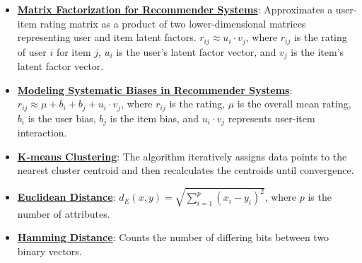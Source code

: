 \documentclass{article}%
\begin{document}
\begin{itemize}[leftmargin=*]
\item \href{https://purdue.brightspace.com/d2l/common/assets/pdfjs-d2l-dist/1.0.14-legacy/web/viewer.html?file=\%2Fcontent\%2Fenforced\%2F1095467-wl.202510.CS.24300.001\%2F11L2-svd-pca-recommender.pdf\%3Fou\%3D1095467\&lang=en-us\&container=d2l-fileviewer-rendered-pdf\&fullscreen=d2l-fileviewer-rendered-pdf-dialog\&height=667#page=36}{\textbf{Matrix Factorization for Recommender Systems}}: Approximates a user-item rating matrix as a product of two lower-dimensional matrices representing user and item latent factors. $r_{ij} \approx u_i \cdot v_j$, where $r_{ij}$ is the rating of user $i$ for item $j$, $u_i$ is the user's latent factor vector, and $v_j$ is the item's latent factor vector.%
\item \href{https://purdue.brightspace.com/d2l/common/assets/pdfjs-d2l-dist/1.0.14-legacy/web/viewer.html?file=\%2Fcontent\%2Fenforced\%2F1095467-wl.202510.CS.24300.001\%2F11L2-svd-pca-recommender.pdf\%3Fou\%3D1095467\&lang=en-us\&container=d2l-fileviewer-rendered-pdf\&fullscreen=d2l-fileviewer-rendered-pdf-dialog\&height=667#page=44}{\textbf{Modeling Systematic Biases in Recommender Systems}}: $r_{ij} \approx \mu + b_i + b_j + u_i \cdot v_j$, where $r_{ij}$ is the rating, $\mu$ is the overall mean rating, $b_i$ is the user bias, $b_j$ is the item bias, and $u_i \cdot v_j$ represents user-item interaction.%
\item \href{https://purdue.brightspace.com/d2l/common/assets/pdfjs-d2l-dist/1.0.14-legacy/web/viewer.html?file=\%2Fcontent\%2Fenforced\%2F1095467-wl.202510.CS.24300.001\%2F12L2-distance-clusters.pdf\%3Fou\%3D1095467\&lang=en-us\&container=d2l-fileviewer-rendered-pdf\&fullscreen=d2l-fileviewer-rendered-pdf-dialog\&height=667#page=22}{\textbf{K-means Clustering}}: The algorithm iteratively assigns data points to the nearest cluster centroid and then recalculates the centroids until convergence.%
\item \href{https://purdue.brightspace.com/d2l/common/assets/pdfjs-d2l-dist/1.0.14-legacy/web/viewer.html?file=\%2Fcontent\%2Fenforced\%2F1095467-wl.202510.CS.24300.001\%2F12L2-distance-clusters.pdf\%3Fou\%3D1095467\&lang=en-us\&container=d2l-fileviewer-rendered-pdf\&fullscreen=d2l-fileviewer-rendered-pdf-dialog\&height=667#page=17}{\textbf{Euclidean Distance}}: $d_E(x, y) = \sqrt{\sum_{i=1}^{p} (x_i - y_i)^2}$, where $p$ is the number of attributes.%
\item \href{https://purdue.brightspace.com/d2l/common/assets/pdfjs-d2l-dist/1.0.14-legacy/web/viewer.html?file=\%2Fcontent\%2Fenforced\%2F1095467-wl.202510.CS.24300.001\%2F12L2-distance-clusters.pdf\%3Fou\%3D1095467\&lang=en-us\&container=d2l-fileviewer-rendered-pdf\&fullscreen=d2l-fileviewer-rendered-pdf-dialog\&height=667#page=19}{\textbf{Hamming Distance}}: Counts the number of differing bits between two binary vectors.%

\end{itemize}
\end{document}
